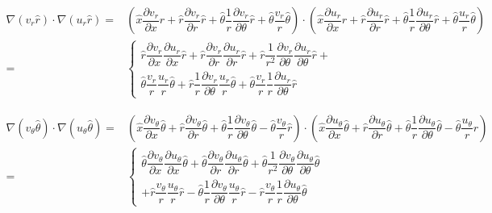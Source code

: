 \documentclass{kthreport}
\begin{document}
\begin{eqnarray}
	\nabla(v_{r}\hat{r})\cdot\nabla (u_{r}\hat{r}) = &\left(\hat{x}\dfrac{\partial v_{r}}{\partial x} \hat{r} + \hat{r}\dfrac{\partial v_{r}}{\partial r}\hat{r} + \hat{\theta}\dfrac{1}{r}\dfrac{\partial v_{r}}{\partial \theta}\hat{r}  + \hat{\theta}\dfrac{v_{r}}{r}\hat{\theta} \right) \cdot
	\left(\hat{x}\dfrac{\partial u_{r}}{\partial x} \hat{r} + \hat{r}\dfrac{\partial u_{r}}{\partial r}\hat{r} + \hat{\theta}\dfrac{1}{r}\dfrac{\partial u_{r}}{\partial \theta}\hat{r}  + \hat{\theta}\dfrac{u_{r}}{r}\hat{\theta} \right) \nonumber \\
	= &\left\{
	\begin{split}
	 \hat{r}\dfrac{\partial v_{r}}{\partial x}\dfrac{\partial u_{r}}{\partial x}\hat{r} + \hat{r}\dfrac{\partial v_{r}}{\partial r}\dfrac{\partial u_{r}}{\partial r}\hat{r} + \hat{r}\dfrac{1}{r^{2}}\dfrac{\partial v_{r}}{\partial \theta}\dfrac{\partial u_{r}}{\partial \theta}\hat{r} + \\
	\hat{\theta}\dfrac{v_{r}}{r}\dfrac{u_{r}}{r}\hat{\theta} 
	+\hat{r}\dfrac{1}{r}\dfrac{\partial v_{r}}{\partial \theta}\dfrac{u_{r}}{r}\hat{\theta}
	+ \hat{\theta}\dfrac{v_{r}}{r}\dfrac{1}{r}\dfrac{\partial u_{r}}{\partial \theta}\hat{r} 	\end{split}\right.
\end{eqnarray}

\begin{eqnarray}
	\nabla(v_{\theta}\hat{\theta})\cdot\nabla (u_{\theta}\hat{\theta}) =&
	 \left(\hat{x}\dfrac{\partial v_{\theta}}{\partial x} \hat{\theta} + \hat{r}\dfrac{\partial v_{\theta}}{\partial r}\hat{\theta} + \hat{\theta}\dfrac{1}{r}\dfrac{\partial v_{\theta}}{\partial \theta}\hat{\theta}  - \hat{\theta}\dfrac{v_{\theta}}{r}\hat{r}  \right)\cdot
	\left(\hat{x}\dfrac{\partial u_{\theta}}{\partial x} \hat{\theta} + \hat{r}\dfrac{\partial u_{\theta}}{\partial r}\hat{\theta} + \hat{\theta}\dfrac{1}{r}\dfrac{\partial u_{\theta}}{\partial \theta}\hat{\theta}  - \hat{\theta}\dfrac{u_{\theta}}{r}\hat{r} \right) \nonumber \\
	= &\left\{
	\begin{split}
			 \hat{\theta}\dfrac{\partial v_{\theta}}{\partial x}\dfrac{\partial u_{\theta}}{\partial x}\hat{\theta} + \hat{\theta}\dfrac{\partial v_{\theta}}{\partial r}\dfrac{\partial u_{\theta}}{\partial r}\hat{\theta} + \hat{\theta}\dfrac{1}{r^{2}}\dfrac{\partial v_{\theta}}{\partial \theta}\dfrac{\partial u_{\theta}}{\partial \theta}\hat{\theta} \\
			 + \hat{r}\dfrac{v_{\theta}}{r}\dfrac{u_{\theta}}{r}\hat{r}  -\hat{\theta}\dfrac{1}{r}\dfrac{\partial v_{\theta}}{\partial \theta}\dfrac{u_{\theta}}{r}\hat{r} 
			 -\hat{r}\dfrac{v_{\theta}}{r}\dfrac{1}{r}\dfrac{\partial u_{\theta}}{\partial \theta}\hat{\theta}
	\end{split}\right.
\end{eqnarray}
\end{document}
